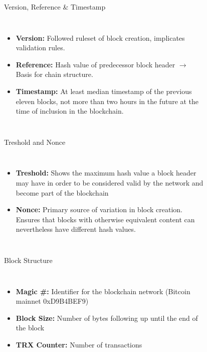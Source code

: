 \documentclass[]{beamer}
\begin{document}
\begin{frame}{Version, Reference \& Timestamp}
	\begin{columns}
		\begin{itemize}
			\item \textbf{Version:} Followed ruleset of block creation, implicates validation rules.
			\item \textbf{Reference:} Hash value of predecessor block header $\rightarrow$ Basis for chain structure.
			\item \textbf{Timestamp:} At least median timestamp of the previous eleven blocks, not more than two hours in the future at the time of inclusion in the blockchain. 
		\end{itemize}
		\begin{figure}
			
		\end{figure}
	\end{columns}
\end{frame}


\begin{frame}{Treshold and Nonce}
	\begin{columns}
	\column{0.7\textwidth}
		\begin{itemize}
			\item \textbf{Treshold:} Shows the maximum hash value a block header may have in order to be considered valid by the network and become part of the blockchain
			\item \textbf{Nonce:} Primary source of variation in block creation. Ensures that blocks with otherwise equivalent content can nevertheless have different hash values.
		\end{itemize}
	\column{0.3\textwidth}
		\begin{figure}
			
		\end{figure}
	\end{columns}
\end{frame}


\begin{frame}{Block Structure}
	\begin{columns}
	\column{0.5\textwidth}
		\begin{itemize}
			\item \textbf{Magic \#:} Identifier for the blockchain network (Bitcoin mainnet 0xD9B4BEF9)
			\item \textbf{Block Size:} Number of bytes following up until the end of the block
			\item \textbf{TRX Counter:} Number of transactions
		\end{itemize}
	\column{0.5\textwidth}
		\begin{figure}
			\begin{tikzpicture}[domain=-8:8,scale=1.2, every node/.style={scale=1.2}]
  				
  			\end{tikzpicture}
			\end{figure}
	\end{columns}
\end{frame}
\end{document}
